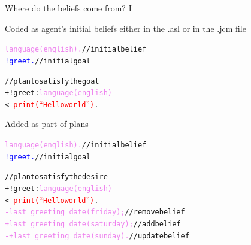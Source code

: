 \documentclass[compress]{beamer}
\newcommand{\planhead}[1]{\textcolor{indiagreen}{#1}}
\newcommand{\desire}[1]{\textcolor{blue}{#1}}
\newcommand{\instruction}[1]{\textcolor{red}{#1}}
\newcommand{\comment}[1]{\textcolor{harvestgold}{#1}}
\newcommand{\belief}[1]{\textcolor{violet}{#1}}
\begin{document}
\begin{frame}[fragile]{Where do the beliefs come from? I}


\begin{block} {Coded as agent's initial beliefs {\tiny either in the .asl or in the .jcm file}}

 
 
  \begin{alltt}\tiny
   \belief{language(english).} \comment{//initial belief}
   \desire{!greet.} \comment{//initial goal}

   \comment{//plan to satisfy the goal}  
   \planhead{+!greet} : \belief{language(english)} 
       <- \instruction{print(``Hello world'')}.
    

\end{alltt}
\end{block}

\begin{block}{Added as part of plans}
  \begin{alltt}\tiny
   \belief{language(english).} \comment{//initial belief} 
   \desire{!greet.} \comment{//initial goal}

   \comment{//plan to satisfy the desire}  
   \planhead{+!greet} : \belief{language(english)}
        <- \instruction{print(``Hello world'')}.
           \belief{-last\_greeting\_date(friday);} \comment{//remove belief}
           \belief{+last\_greeting\_date(saturday);} \comment{//add belief}
           \belief{-+last\_greeting\_date(sunday).} \comment{//update belief}

\end{alltt}
\end{block}


 
\end{frame}
\end{document}
